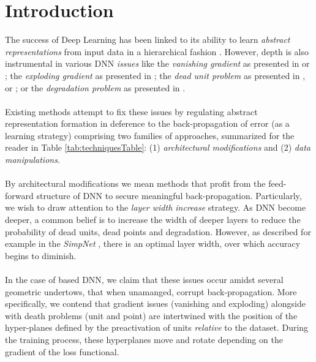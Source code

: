 \section{Introduction}\label{sec:introduction}
The success of Deep Learning has been linked to its ability to learn \emph{abstract representations} from input data in a hierarchical fashion  \cite{LeCun06atutorial,ramachandranEtAl2017SearchingForActivationFunctions}. However, depth is also instrumental in various DNN \emph{issues} like the \emph{vanishing gradient} as presented in \cite{vanishing1} or \cite{vanishing2}; the \emph{exploding gradient} as presented in \cite{exploding}; the \emph{dead unit problem} as presented in \cite{leaky},\cite{whyreludie} or \cite{whenneuronsfail}; or the \emph{degradation problem} as presented in \cite{resnet}. 
\\\\
Existing methods attempt to fix these issues by regulating abstract representation formation in deference to the back-propagation of error (as a learning strategy) comprising two families of approaches, summarized for the reader in Table \ref{tab:techniquesTable}: (1) \emph{architectural modifications} and (2) \emph{data manipulations}. 
\\\\
By architectural modifications we mean methods that profit from the feed-forward structure of DNN to secure meaningful back-propagation. Particularly, we wish to draw attention to the \emph{layer width increase} strategy. As DNN become deeper, a common belief is to increase the width of deeper layers to reduce the probability of dead units, dead points and degradation. However, as described for example in the \emph{SimpNet} \cite{simpnet}, there is an optimal layer width, over which accuracy begins to diminish.  
\\\\
In the case of \ReLU based DNN, we claim that these issues occur amidst several geometric undertows, that when unamanged, corrupt  back-propagation. More specifically, we contend that gradient issues (vanishing and exploding) alongside with death problems (unit and point) are intertwined with the position of the hyper-planes defined by the preactivation of \ReLU units \emph{relative} to the dataset. During the training process, these hyperplanes move and rotate depending on the gradient of the loss functional.    
\\\\
